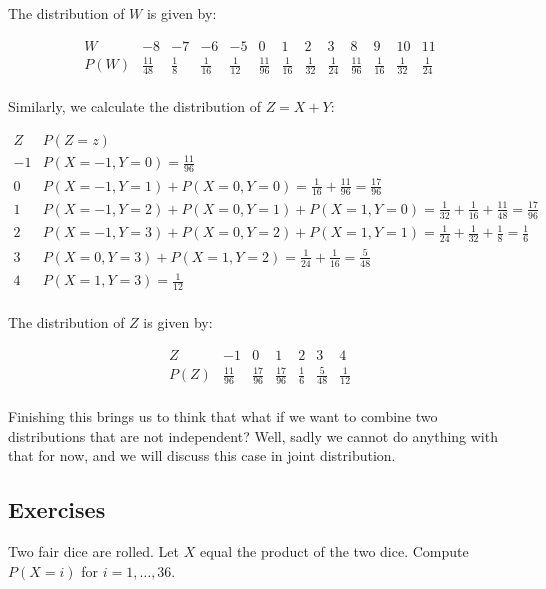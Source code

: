 \begin{example}
\begin{solution}
The distribution of \(W\) is given by:

\[
\begin{array}{c|cccccccccccc}
W & -8 & -7 & -6 & -5 & 0 & 1 & 2 & 3 & 8 & 9 & 10 & 11 \\
\hline
P(W) & \frac{11}{48} & \frac{1}{8} & \frac{1}{16} & \frac{1}{12} & \frac{11}{96} & \frac{1}{16} & \frac{1}{32} & \frac{1}{24} & \frac{11}{96} & \frac{1}{16} & \frac{1}{32} & \frac{1}{24} \\
\end{array}
\]



Similarly, we calculate the distribution of \(Z = X + Y\):

\[
\begin{array}{c|c}
Z & P(Z = z) \\
\hline
-1 & P(X = -1, Y = 0) = \frac{11}{96} \\
0 & P(X = -1, Y = 1) + P(X = 0, Y = 0) = \frac{1}{16} + \frac{11}{96} = \frac{17}{96} \\
1 & P(X = -1, Y = 2) + P(X = 0, Y = 1) + P(X = 1, Y = 0) = \frac{1}{32} + \frac{1}{16} + \frac{11}{48} = \frac{17}{96} \\
2 & P(X = -1, Y = 3) + P(X = 0, Y = 2) + P(X = 1, Y = 1) = \frac{1}{24} + \frac{1}{32} + \frac{1}{8} = \frac{1}{6} \\
3 & P(X = 0, Y = 3) + P(X = 1, Y = 2) = \frac{1}{24} + \frac{1}{16} = \frac{5}{48} \\
4 & P(X = 1, Y = 3) = \frac{1}{12} \\
\end{array}
\]

The distribution of \(Z\) is given by:

\[
\begin{array}{c|cccccc}
Z & -1 & 0 & 1 & 2 & 3 & 4 \\
\hline
P(Z) & \frac{11}{96} & \frac{17}{96} & \frac{17}{96} & \frac{1}{6} & \frac{5}{48} & \frac{1}{12} \\
\end{array}
\]

\end{solution}
\end{example}

Finishing this brings us to think that what if we want to combine two distributions that are not independent? Well, sadly we cannot do anything with that for now, and we will discuss this case in joint distribution.

\subsection{Exercises}
\begin{exercise}
Two fair dice are rolled. Let \(X\) equal the product of the two dice. Compute \(P(X = i)\) for \(i = 1, \ldots, 36\).
\end{exercise}

